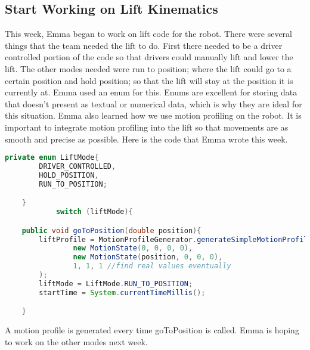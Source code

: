 \documentclass{article}
\newif\ifcontents
\begin{document}
\contentsfalse
\subsection{Start Working on Lift Kinematics}
This week, Emma began to work on lift code for the robot. There were several things that the team needed the lift to do. First there needed to be a driver controlled portion of the code so that drivers could manually lift and lower the lift. The other modes needed were run to position; where the lift could go to a certain position and hold position; so that the lift will stay at the position it is currently at. Emma used an enum for this. Enums are excellent for storing data that doesn't present as textual or numerical data, which is why they are ideal for this situation. Emma also learned how we use motion profiling on the robot. It is important to integrate motion profiling into the lift so that movements are as smooth and precise as possible. Here is the code that Emma wrote this week.
\begin{lstlisting}[language=Java]
    private enum LiftMode{
        DRIVER_CONTROLLED,
        HOLD_POSITION,
        RUN_TO_POSITION;

    }
            switch (liftMode){

    public void goToPosition(double position){
        liftProfile = MotionProfileGenerator.generateSimpleMotionProfile(
                new MotionState(0, 0, 0, 0),
                new MotionState(position, 0, 0, 0),
                1, 1, 1 //find real values eventually
        );
        liftMode = LiftMode.RUN_TO_POSITION;
        startTime = System.currentTimeMillis();

    }
\end{lstlisting}
A motion profile is generated every time goToPosition is called. Emma is hoping to work on the other modes next week.
\end{document}
